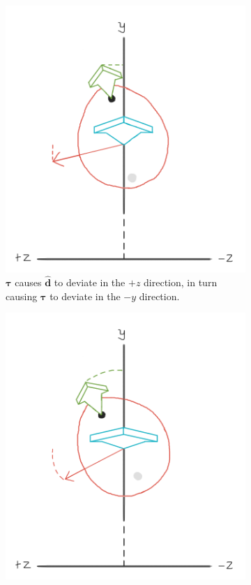 \documentclass{article}
\begin{document}
\begin{figure}[h]
\begin{subfigure}[b]{0.3\textwidth}
         \includegraphics[width=\textwidth]{img/precession (2).png}
         \caption{$\pmb{\tau}$ causes $\mathbf{\hat{d}}$ to deviate in the $+z$ direction, in turn causing $\pmb{\tau}$ to deviate in the $-y$ direction.}
         \label{precession2}
     \end{subfigure}
     \hfill
     \begin{subfigure}[b]{0.3\textwidth}
         \includegraphics[width=\textwidth]{img/precession (3).png}

\end{subfigure}
\end{figure}
\end{document}
